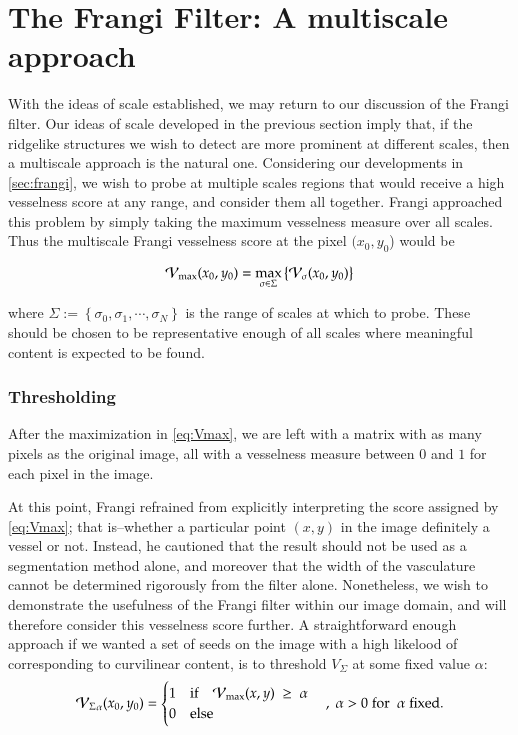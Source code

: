  \chapter{The Frangi Filter: A multiscale approach} \label{sec:frangi-multiscale}
    
     With the ideas of scale established, we may return to our discussion of the Frangi filter.
    Our ideas of scale developed in the previous section imply that, if the ridgelike structures we wish to detect are more prominent at different scales, then a multiscale approach is the natural one. Considering our
    developments in \cref{sec:frangi}, we wish to probe at multiple scales
    regions that would receive a high vesselness score at any range,
    and consider them all together. Frangi \cite{frangi-paper} approached this problem by simply taking the maximum vesselness measure over all scales. Thus the multiscale Frangi vesselness score at the pixel $(x_0, y_0$) would be 
    
    \begin{equation} \label{eq:Vmax}
    \mathcal{V}_{\max}(x_0, y_0) =
    	\underset{\sigma \in \Sigma}{\max}\left\{  \mathcal{V}_{\sigma} (x_0, y_0) \right\}
    \end{equation}
    
    where $\Sigma := \left\{ \sigma_0, \sigma_1 , \cdots, \sigma_N \right\}$ is
    the range of scales at which to probe. These should be chosen to be representative enough of all scales where meaningful content is expected to be found.
    
   
    \subsection{Thresholding}
    
    After the maximization in \cref{eq:Vmax}, we are left with a matrix with as many pixels as the original image, all with a vesselness measure between $0$ and $1$ for each pixel in the image.
       
    At this point, Frangi \cite{frangi-paper} refrained from explicitly interpreting the score assigned by \cref{eq:Vmax}; that is--whether a particular point $(x,y)$ in the image definitely a vessel or not. Instead, he cautioned that the result should not be used as a segmentation method alone, and moreover that the width of the vasculature cannot be determined rigorously from the filter alone.   
    Nonetheless, we wish to demonstrate the usefulness of the Frangi filter within our image domain, and will therefore consider this vesselness score further. A straightforward enough approach if we wanted a set of seeds on the image with a high likelood of corresponding to curvilinear content, is to threshold $V_\Sigma$ at some fixed value $\alpha$:
    \begin{equation}
    {\ensuremath{\mathcal{V}_{\Sigma}}}_{\alpha}(x_0,y_0) = \begin{cases}
    1 & \textrm{if}\quad \mathcal{V}_{\max}(x,y) \; \ge\;  \alpha \\
    0 & \textrm{else}
    \end{cases}  \quad , \; \alpha > 0
	    \; \textrm{for } \; \alpha \;\textrm{fixed}.
    \end{equation}
    

